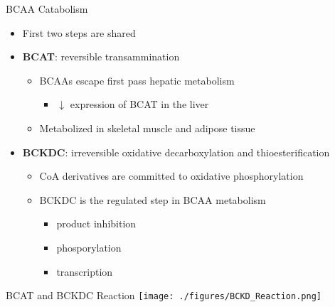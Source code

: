 \documentclass[presentation, smaller]{beamer}
\begin{document}
\begin{frame}[label={sec:orgheadline7}]{BCAA Catabolism}
\begin{itemize}
\item First two steps are shared
\item \textbf{BCAT}: reversible transammination
\begin{itemize}
\item BCAAs escape first pass hepatic metabolism
\begin{itemize}
\item \(\downarrow\) expression of BCAT in the liver
\end{itemize}
\item Metabolized in skeletal muscle and adipose tissue
\end{itemize}
\item \textbf{BCKDC}: irreversible oxidative decarboxylation and thioesterification
\begin{itemize}
\item CoA derivatives are committed to oxidative phosphorylation
\item BCKDC is the regulated step in BCAA metabolism
\begin{itemize}
\item product inhibition
\item phosporylation
\item transcription
\end{itemize}
\end{itemize}
\end{itemize}
\end{frame}
\begin{frame}[label={sec:orgheadline8}]{BCAT and BCKDC Reaction}
\centering
\texttt{[image: ./figures/BCKD\_Reaction.png]}
\end{frame}
\end{document}
